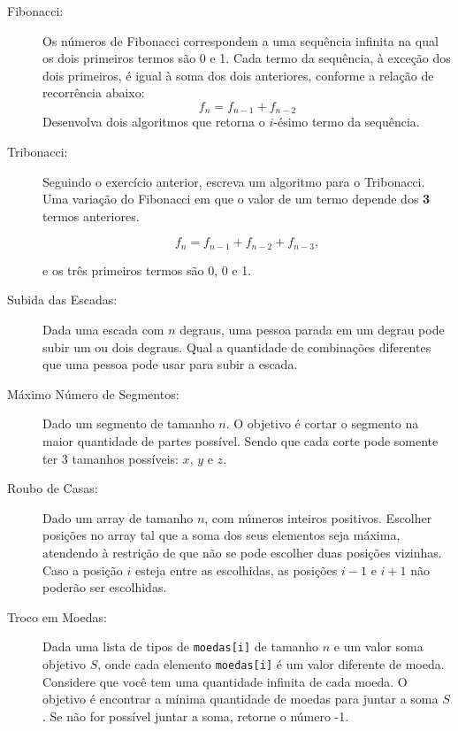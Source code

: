 \documentclass[12pt]{article}
\def\code#1{\texttt{#1}}
\begin{document}
\begin{description}



\item[Fibonacci:] 
Os números de Fibonacci correspondem a uma sequência 
infinita na qual os dois primeiros termos são 0 e 1. 
Cada termo da sequência, 
à exceção dos dois primeiros, 
é igual à soma dos dois anteriores, 
conforme a relação de recorrência abaixo:
\[f_n = f_{n-1} + f_{n-2}\]
Desenvolva dois algoritmos que retorna o $i$-ésimo termo da sequência.



\item[Tribonacci:]
Seguindo o exercício anterior, 
escreva um algoritmo para o Tribonacci. 
Uma variação do Fibonacci em que o valor de um termo 
depende dos \textbf{3} termos anteriores.

\[f_n = f_{n-1} + f_{n-2} + f_{n-3},\]

e os três primeiros termos são 0, 0 e 1. 



\item[Subida das Escadas:]
Dada uma escada com $n$ degraus, uma pessoa parada em um degrau pode 
subir um ou dois degraus.
Qual a quantidade de combinações diferentes que uma pessoa pode usar para
subir a escada.



\item[Máximo Número de Segmentos:]
Dado um segmento de tamanho $n$. 
O objetivo é cortar o segmento na maior quantidade de partes possível.
Sendo que cada corte pode somente ter 3 tamanhos possíveis: $x$, $y$ e $z$.



\item[Roubo de Casas:] 
Dado um array de tamanho $n$, com números inteiros positivos.
Escolher posições no array tal que a soma dos seus elementos seja máxima, 
atendendo à restrição de que 
não se pode escolher duas posições vizinhas.
Caso a posição $i$ esteja entre as escolhidas, 
as posições $i-1$ e $i+1$ não poderão ser escolhidas.




\item[Troco em Moedas:]
Dada uma lista de tipos de \code{moedas[i]} de tamanho $n$ e 
um valor soma objetivo $S$, 
onde cada elemento \code{moedas[i]} é um valor diferente de moeda.
Considere que você tem uma quantidade infinita de cada moeda.
O objetivo é encontrar a mínima quantidade de moedas para juntar a soma $S$.
Se não for possível juntar a soma, retorne o número -1.





\end{description}
\end{document}
